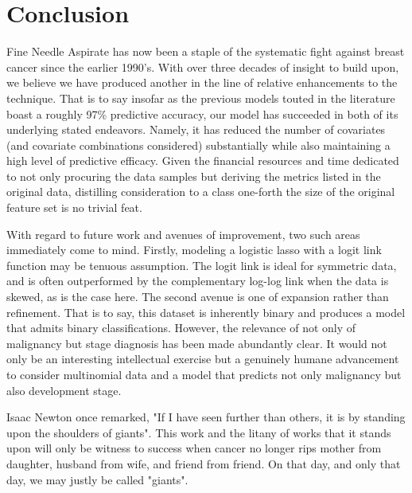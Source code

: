 \documentclass[11pt]{article}
\begin{document}
\section{Conclusion}

	Fine Needle Aspirate has now been a staple of the systematic fight against breast cancer since the earlier 1990's.  With over three decades of insight to build upon, we believe we have produced another in the line of relative enhancements to the technique.  That is to say insofar as the previous models touted in the literature boast a roughly 97\% predictive accuracy, our model has succeeded in both of its underlying stated endeavors.  Namely, it has reduced the number of covariates (and covariate combinations considered) substantially while also maintaining a high level of predictive efficacy.  Given the financial resources and time dedicated to not only procuring the data samples but deriving the metrics listed in the original data, distilling consideration to a class one-forth the size of the original feature set is no trivial feat.  
	
	With regard to future work and avenues of improvement, two such areas immediately come to mind.  Firstly, modeling a logistic lasso with a logit link function may be tenuous assumption.  The logit link is ideal for symmetric data, and is often outperformed by the complementary log-log link when the data is skewed, as is the case here.  The second avenue is one of expansion rather than refinement.  That is to say, this dataset is inherently binary and produces a model that admits binary classifications.  However, the relevance of not only of malignancy but stage diagnosis has been made abundantly clear.  It would not only be an interesting intellectual exercise but a genuinely humane advancement to consider multinomial data and a model that predicts not only malignancy but also development stage.  

	Isaac Newton once remarked, "If I have seen further than others, it is by standing upon the shoulders of giants".  This work and the litany of works that it stands upon will only be witness to success when cancer no longer rips mother from daughter, husband from wife, and friend from friend.  On that day, and only that day, we may justly be called "giants".  

	
		 
\newpage
\end{document}
